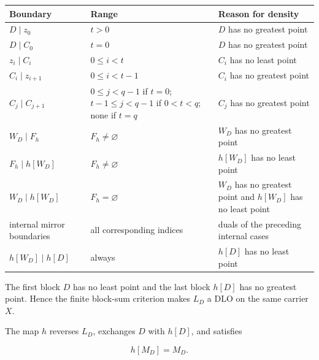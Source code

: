 \documentclass[
  english,
  11pt,
  reqno]{amsart}
\newcounter{none} %
\begin{document}
{\def\LTcaptype{none} %
\begin{longtable}[]{@{}
  >{\raggedright\arraybackslash}p{}
  >{\raggedright\arraybackslash}p{}
  >{\raggedright\arraybackslash}p{}@{}}
\toprule\noalign{}
\begin{minipage}[b]{\linewidth}\raggedright
Boundary
\end{minipage} & \begin{minipage}[b]{\linewidth}\raggedright
Range
\end{minipage} & \begin{minipage}[b]{\linewidth}\raggedright
Reason for density
\end{minipage} \\
\midrule\noalign{}
\endhead
\bottomrule\noalign{}
\endlastfoot
\(D\mid z_0\) & \(t>0\) & \(D\) has no greatest point \\
\(D\mid C_0\) & \(t=0\) & \(D\) has no greatest point \\
\(z_i\mid C_i\) & \(0\le i<t\) & \(C_i\) has no least point \\
\(C_i\mid z_{i+1}\) & \(0\le i<t-1\) & \(C_i\) has no greatest point \\
\(C_j\mid C_{j+1}\) & \(0\le j<q-1\) if \(t=0\); \(t-1\le j<q-1\) if
\(0<t<q\); none if \(t=q\) & \(C_j\) has no greatest point \\
\(W_D\mid F_h\) & \(F_h\ne\varnothing\) & \(W_D\) has no greatest
point \\
\(F_h\mid h[W_D]\) & \(F_h\ne\varnothing\) & \(h[W_D]\) has no least
point \\
\(W_D\mid h[W_D]\) & \(F_h=\varnothing\) & \(W_D\) has no greatest point
and \(h[W_D]\) has no least point \\
internal mirror boundaries & all corresponding indices & duals of the
preceding internal cases \\
\(h[W_D]\mid h[D]\) & always & \(h[D]\) has no least point \\
\end{longtable}
}

The first block \(D\) has no least point and the last block \(h[D]\) has
no greatest point. Hence the finite block-sum criterion makes \(L_D\) a
DLO on the same carrier \(X\).

The map \(h\) reverses \(L_D\), exchanges \(D\) with \(h[D]\), and
satisfies

\[
h[M_D]=M_D.
\]
\end{document}
